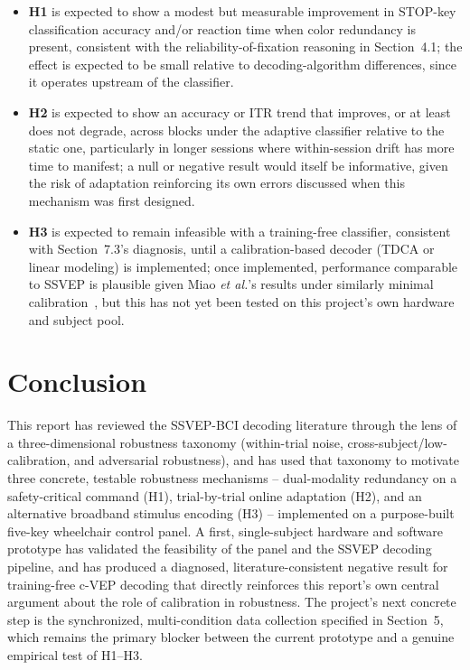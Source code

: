 \documentclass[11pt]{article}
\begin{document}
\begin{itemize}
  \item \textbf{H1} is expected to show a modest but measurable improvement in STOP-key classification accuracy and/or reaction time when color redundancy is present, consistent with the reliability-of-fixation reasoning in Section~4.1; the effect is expected to be small relative to decoding-algorithm differences, since it operates upstream of the classifier.
  \item \textbf{H2} is expected to show an accuracy or ITR trend that improves, or at least does not degrade, across blocks under the adaptive classifier relative to the static one, particularly in longer sessions where within-session drift has more time to manifest; a null or negative result would itself be informative, given the risk of adaptation reinforcing its own errors discussed when this mechanism was first designed.
  \item \textbf{H3} is expected to remain infeasible with a training-free classifier, consistent with Section~7.3's diagnosis, until a calibration-based decoder (TDCA or linear modeling) is implemented; once implemented, performance comparable to SSVEP is plausible given Miao \textit{et al.}'s results under similarly minimal calibration~\cite{miao2024cvepminimal}, but this has not yet been tested on this project's own hardware and subject pool.
\end{itemize}


\section{Conclusion}

This report has reviewed the SSVEP-BCI decoding literature through the lens of a three-dimensional robustness taxonomy (within-trial noise, cross-subject/low-calibration, and adversarial robustness), and has used that taxonomy to motivate three concrete, testable robustness mechanisms -- dual-modality redundancy on a safety-critical command (H1), trial-by-trial online adaptation (H2), and an alternative broadband stimulus encoding (H3) -- implemented on a purpose-built five-key wheelchair control panel. A first, single-subject hardware and software prototype has validated the feasibility of the panel and the SSVEP decoding pipeline, and has produced a diagnosed, literature-consistent negative result for training-free c-VEP decoding that directly reinforces this report's own central argument about the role of calibration in robustness. The project's next concrete step is the synchronized, multi-condition data collection specified in Section~5, which remains the primary blocker between the current prototype and a genuine empirical test of H1--H3.
\end{document}
